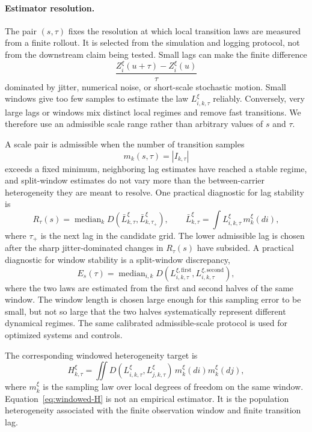 \paragraph{Estimator resolution.}
The pair \((s,\tau)\) fixes the resolution at which local transition laws are measured from a finite rollout.  It is selected from the simulation and logging protocol, not from the downstream claim being tested.  Small lags can make the finite difference
\[
  \frac{Z_i^\xi(u+\tau)-Z_i^\xi(u)}{\tau}
\]
dominated by jitter, numerical noise, or short-scale stochastic motion.  Small windows give too few samples to estimate the law \(L_{i,k,\tau}^{\xi}\) reliably.  Conversely, very large lags or windows mix distinct local regimes and remove fast transitions.  We therefore use an admissible scale range rather than arbitrary values of \(s\) and \(\tau\).

A scale pair is admissible when the number of transition samples
\[
  m_k(s,\tau)=|I_{k,\tau}|
\]
exceeds a fixed minimum, neighboring lag estimates have reached a stable regime, and split-window estimates do not vary more than the between-carrier heterogeneity they are meant to resolve.  One practical diagnostic for lag stability is
\[
  R_\tau(s)=\operatorname{median}_{k}
  D\!\left(\bar L_{k,\tau}^{\xi},\bar L_{k,\tau_+}^{\xi}\right),
  \qquad
  \bar L_{k,\tau}^{\xi}=\int L_{i,k,\tau}^{\xi}\,m_k^\xi(di),
\]
where \(\tau_+\) is the next lag in the candidate grid.  The lower admissible lag is chosen after the sharp jitter-dominated changes in \(R_\tau(s)\) have subsided.  A practical diagnostic for window stability is a split-window discrepancy,
\[
  E_s(\tau)=\operatorname{median}_{i,k}
  D\!\left(L_{i,k,\tau}^{\xi,\mathrm{first}},L_{i,k,\tau}^{\xi,\mathrm{second}}\right),
\]
where the two laws are estimated from the first and second halves of the same window.  The window length is chosen large enough for this sampling error to be small, but not so large that the two halves systematically represent different dynamical regimes.  The same calibrated admissible-scale protocol is used for optimized systems and controls.

The corresponding windowed heterogeneity target is
\begin{equation}
H_{k,\tau}^{\xi}
  =
  \iint
  D\left(L_{i,k,\tau}^{\xi},L_{j,k,\tau}^{\xi}\right)
  \,m_k^\xi(di)m_k^\xi(dj),
  \label{eq:windowed-H}
\end{equation}
where \(m_k^\xi\) is the sampling law over local degrees of freedom on the same window.  Equation~\eqref{eq:windowed-H} is not an empirical estimator.  It is the population heterogeneity associated with the finite observation window and finite transition lag.

